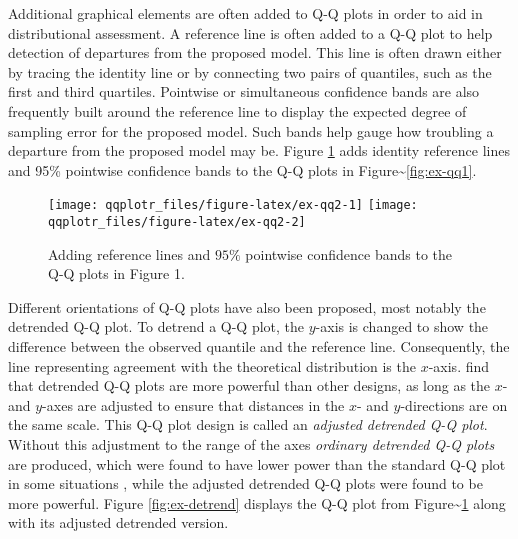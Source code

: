 Additional graphical elements are often added to Q-Q plots in order to
aid in distributional assessment. A reference line is often added to a
Q-Q plot to help detection of departures from the proposed model. This
line is often drawn either by tracing the identity line or by connecting
two pairs of quantiles, such as the first and third quartiles. Pointwise
or simultaneous confidence bands are also frequently built around the
reference line to display the expected degree of sampling error for the
proposed model. Such bands help gauge how troubling a departure from the
proposed model may be. Figure \ref{fig:ex-qq2} adds identity reference
lines and 95\% pointwise confidence bands to the Q-Q plots in
Figure\textasciitilde{}\ref{fig:ex-qq1}.

\begin{Schunk}
\begin{figure}

{\centering \texttt{[image: qqplotr\_files/figure-latex/ex-qq2-1]} \texttt{[image: qqplotr\_files/figure-latex/ex-qq2-2]} 

}

\caption[Adding reference lines and $95\%$ pointwise confidence bands to the Q-Q plots in Figure 1]{Adding reference lines and $95\%$ pointwise confidence bands to the Q-Q plots in Figure 1.}\label{fig:ex-qq2}
\end{figure}
\end{Schunk}

Different orientations of Q-Q plots have also been proposed, most
notably the detrended Q-Q plot. To detrend a Q-Q plot, the \(y\)-axis is
changed to show the difference between the observed quantile and the
reference line. Consequently, the line representing agreement with the
theoretical distribution is the \(x\)-axis. \citet{Loy2016-fg} find that
detrended Q-Q plots are more powerful than other designs, as long as the
\(x\)- and \(y\)-axes are adjusted to ensure that distances in the
\(x\)- and \(y\)-directions are on the same scale. This Q-Q plot design
is called an \emph{adjusted detrended Q-Q plot}. Without this adjustment
to the range of the axes \emph{ordinary detrended Q-Q plots} are
produced, which were found to have lower power than the standard Q-Q
plot in some situations \citep{Loy2016-fg}, while the adjusted detrended
Q-Q plots were found to be more powerful. Figure \ref{fig:ex-detrend}
displays the Q-Q plot from Figure\textasciitilde{}\ref{fig:ex-qq2} along
with its adjusted detrended version.

